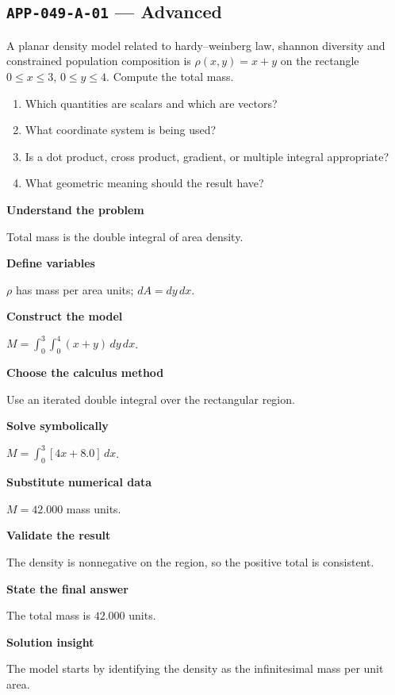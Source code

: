 \documentclass[11pt]{book}
\newcommand{\pid}[1]{\texttt{#1}}
\begin{document}
\subsection*{\pid{APP-049-A-01} — Advanced}
\begin{problembox}
A planar density model related to hardy–weinberg law, shannon diversity and constrained population composition is $\rho(x,y)=x+y$ on the rectangle $0\le x\le 3$, $0\le y\le 4$. Compute the total mass.
\end{problembox}
\begin{promptbox}\begin{enumerate}
\item Which quantities are scalars and which are vectors?
\item What coordinate system is being used?
\item Is a dot product, cross product, gradient, or multiple integral appropriate?
\item What geometric meaning should the result have?
\end{enumerate}\end{promptbox}
\begin{solutionbox}
\textbf{Understand the problem}\par Total mass is the double integral of area density.\par\medskip
\textbf{Define variables}\par $\rho$ has mass per area units; $dA=dy\,dx$.\par\medskip
\textbf{Construct the model}\par $M=\int_0^{3}\int_0^{4}(x+y)\,dy\,dx$.\par\medskip
\textbf{Choose the calculus method}\par Use an iterated double integral over the rectangular region.\par\medskip
\textbf{Solve symbolically}\par $M=\int_0^{3}[4x+8.0]\,dx$.\par\medskip
\textbf{Substitute numerical data}\par $M=42.000$ mass units.\par\medskip
\textbf{Validate the result}\par The density is nonnegative on the region, so the positive total is consistent.\par\medskip
\textbf{State the final answer}\par The total mass is $42.000$ units.\par\medskip
\textbf{Solution insight}\par The model starts by identifying the density as the infinitesimal mass per unit area.\par\medskip
\end{solutionbox}
\end{document}
